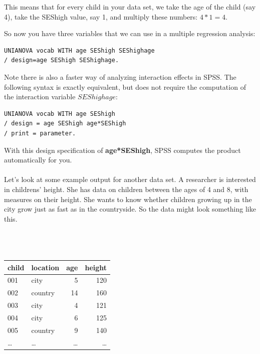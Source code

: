 \documentclass[]{report}\usepackage[]{graphicx}\usepackage[]{color}
\begin{document}
This means that for every child in your data set, we take the age of the child (say 4), take the SEShigh value, say 1, and multiply these numbers: $4*1=4$.


So now you have three variables that we can use in a multiple regression analysis:

\begin{verbatim}
UNIANOVA vocab WITH age SEShigh SEShighage
/ design=age SEShigh SEShighage.
\end{verbatim}


Note there is also a faster way of analyzing interaction effects in SPSS. The following syntax is exactly equivalent, but does not require the computation of the interaction variable $SEShighage$:

\begin{verbatim}
UNIANOVA vocab WITH age SEShigh 
/ design = age SEShigh age*SEShigh
/ print = parameter.
\end{verbatim}

With this design specification of \textbf{age*SEShigh}, SPSS computes the product automatically for you.
\\
\\
Let's look at some example output for another data set. A researcher is interested in childrens' height. She has data on children between the ages of 4 and 8, with measures on their height. She wants to know whether children growing up in the city grow just as fast as in the countryside. So the data might look something like this.
 \\
 \\
 \\
 \\
 \begin{tabular}{llrr}
 child & location & age & height\\ \hline
 001 & city & 5 & 120\\
 002 & country & 14 & 160\\
 003 & city & 4 & 121\\
 004 & city & 6 & 125\\
 005 & country & 9 & 140\\
 \dots & \dots & \dots & \dots\\
 \end{tabular}
\\
\\
\\
 \\
\end{document}
